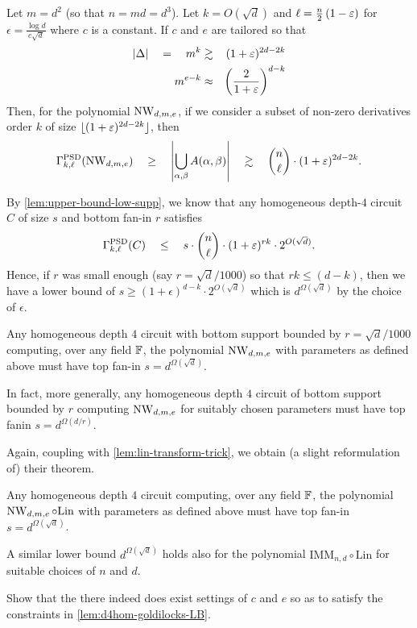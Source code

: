 \begin{lemma}\label{lem:d4hom-goldilocks-LB}
Let $m = d^2$ (so that $n = md = d^3$). 
Let $k = O(\sqrt{d})$ and  $\ell  = \frac{n}{2}\left(1 - \varepsilon\right)$ for $\epsilon = \frac{\log d}{c \sqrt{d}}$ where $c$ is a constant. 
If $c$ and $e$ are tailored so that 
\begin{eqnarray*}
 \left|\Delta\right| \quad = \quad m^k & \gtrsim &  (1+\varepsilon)^{2d - 2k}\\
 m^{e-k} & \approx & \left(\frac{2}{1+\varepsilon}\right)^{d-k}
\end{eqnarray*}
Then, for the polynomial $\operatorname{\mathrm{NW}}_{d,m,e}$, if we consider a subset of non-zero derivatives order $k$ of size $\lfloor (1+\varepsilon)^{2d - 2k} \rfloor$, then
\[
\Gamma^{\mathrm{PSD}}_{k,\ell}(\operatorname{\mathrm{NW}}_{d,m,e})\quad \geq \quad\left|\bigcup_{\alpha, \beta} A(\alpha, \beta)\right| \quad \gtrsim \quad \binom{n}{\ell} \cdot (1+\varepsilon)^{2d-2k}.
\] 
\end{lemma}

By \autoref{lem:upper-bound-low-supp}, we know that any homogeneous depth-$4$ circuit $C$ of size $s$ and bottom fan-in $r$ satisfies
\[
\Gamma^{\mathrm{PSD}}_{k,\ell}(C)\quad \leq \quad s \cdot \binom{n}{\ell} \cdot (1+\varepsilon)^{rk} \cdot 2^{O(\sqrt{d})}.
\]
Hence, if $r$ was small enough (say $r = \sqrt{d}/1000$) so that $rk \leq (d-k)$, then we have a lower bound of $s \geq (1+\epsilon)^{d-k} \cdot 2^{O(\sqrt{d})}$ which is $d^{\Omega(\sqrt{d})}$ by the choice of $\epsilon$. 
\begin{theorem}[\cite{KS14}]\label{thm:IMM-lowsup-lb}
Any homogeneous depth $4$ circuit with bottom support bounded by $r = \sqrt{d}/1000$ computing, over any field $\mathbb{F}$, the polynomial $\operatorname{\mathrm{NW}}_{d,m,e}$ with parameters as defined above must have top fan-in $s = d^{\Omega(\sqrt{d})}$. 

In fact, more generally, any homogeneous depth $4$ circuit of bottom support bounded by $r$ computing $\operatorname{\mathrm{NW}}_{d,m,e}$ for suitably chosen parameters must have top fanin $s = d^{\Omega(d/r)}$. 
\end{theorem}

Again, coupling with \autoref{lem:lin-transform-trick}, we obtain (a slight reformulation of) their theorem. 

\begin{theorem}\label{thm:IMM-lb}
Any homogeneous depth $4$ circuit computing, over any field $\mathbb{F}$,  the polynomial $\operatorname{\mathrm{NW}}_{d,m,e}\circ \mathrm{Lin}$ with parameters as defined above must have top fan-in $s = d^{\Omega(\sqrt{d})}$. 

A similar lower bound $d^{\Omega(\sqrt{d})}$ holds also for the polynomial $\mathrm{IMM}_{n,d} \circ \mathrm{Lin}$ for suitable choices of $n$ and $d$. 
\end{theorem}

\begin{exercise} Show that the there indeed does exist settings of $c$ and $e$ so as to satisfy the constraints in \autoref{lem:d4hom-goldilocks-LB}.
\end{exercise}


